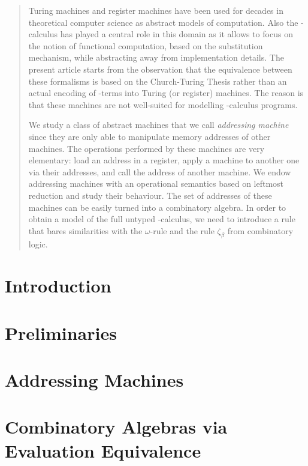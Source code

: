 \documentclass[hidelinks]{lmcs} %
\theoremstyle{plain}\newtheorem{satz}[thm]{Satz} %
\begin{document}
\begin{abstract}
  \noindent Turing machines and register machines have been used for decades in theoretical computer science as abstract models of computation.
Also the \lam-calculus has played a central role in this domain as it allows to focus on the notion of functional computation, based on the substitution mechanism, while abstracting away from implementation details.
The present article starts from the observation that the equivalence between these formalisms is based on the Church-Turing Thesis rather than an actual encoding of \lam-terms into Turing (or register) machines. The reason is that these machines are not well-suited for modelling \lam-calculus programs.

We study a class of abstract machines that we call \emph{addressing machine} since they are only able to manipulate memory addresses of other machines. The operations performed by these machines are very elementary: load an address in a register, apply a machine to another one via their addresses, and call the address of another machine. We endow addressing machines with an operational semantics based on leftmost reduction and study their behaviour. The set of addresses of these machines can be easily turned into a combinatory algebra.
In order to obtain a model of the full untyped \lam-calculus, we need to introduce a rule that bares similarities with the $\omega$-rule and the rule $\zeta_\beta$ from combinatory logic.
\end{abstract}

\maketitle

\section*{Introduction}

\section{Preliminaries}\label{sec:pre}

\section{Addressing Machines}\label{sec:machines}

\section{Combinatory Algebras via Evaluation Equivalence}\label{sec:combalg}

\end{document}
